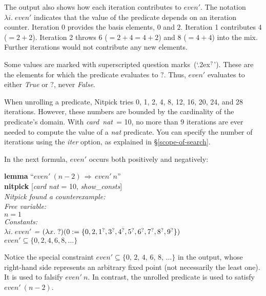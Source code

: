 \documentclass[a4paper,12pt]{article}
\def\unk{{?}}
\def\undef{(\lambda x.\; \unk)}
\def\unr{\ldots}
\def\Q{{\smash{\lower.2ex\hbox{$\scriptstyle?$}}}}
\begin{document}
The output also shows how each iteration contributes to $\textit{even}'$. The
notation $\lambda i.\; \textit{even}'$ indicates that the value of the
predicate depends on an iteration counter. Iteration 0 provides the basis
elements, $0$ and $2$. Iteration 1 contributes $4$ ($= 2 + 2$). Iteration 2
throws $6$ ($= 2 + 4 = 4 + 2$) and $8$ ($= 4 + 4$) into the mix. Further
iterations would not contribute any new elements.

Some values are marked with superscripted question
marks~(`\lower.2ex\hbox{$^\Q$}'). These are the elements for which the
predicate evaluates to $\unk$. Thus, $\textit{even}'$ evaluates to either
\textit{True} or $\unk$, never \textit{False}.

When unrolling a predicate, Nitpick tries 0, 1, 2, 4, 8, 12, 16, 20, 24, and 28
iterations. However, these numbers are bounded by the cardinality of the
predicate's domain. With \textit{card~nat}~= 10, no more than 9 iterations are
ever needed to compute the value of a \textit{nat} predicate. You can specify
the number of iterations using the \textit{iter} option, as explained in
\S\ref{scope-of-search}.

In the next formula, $\textit{even}'$ occurs both positively and negatively:

\prew
\textbf{lemma} ``$\textit{even}'~(n - 2) \,\Longrightarrow\, \textit{even}'~n$'' \\
\textbf{nitpick} [\textit{card nat} = 10, \textit{show\_consts}] \\[2\smallskipamount]
\slshape Nitpick found a counterexample: \\[2\smallskipamount]
\hbox{}\qquad Free variable: \nopagebreak \\
\hbox{}\qquad\qquad $n = 1$ \\
\hbox{}\qquad Constants: \nopagebreak \\
\hbox{}\qquad\qquad $\lambda i.\; \textit{even}'$ = $\undef(\!\begin{aligned}[t]
& 0 := \{0, 2, 1^\Q, 3^\Q, 4^\Q, 5^\Q, 6^\Q, 7^\Q, 8^\Q, 9^\Q\})\end{aligned}$  \\
\hbox{}\qquad\qquad $\textit{even}' \subseteq \{0, 2, 4, 6, 8, \unr\}$
\postw

Notice the special constraint $\textit{even}' \subseteq \{0,\, 2,\, 4,\, 6,\,
8,\, \unr\}$ in the output, whose right-hand side represents an arbitrary
fixed point (not necessarily the least one). It is used to falsify
$\textit{even}'~n$. In contrast, the unrolled predicate is used to satisfy
$\textit{even}'~(n - 2)$.
\end{document}
